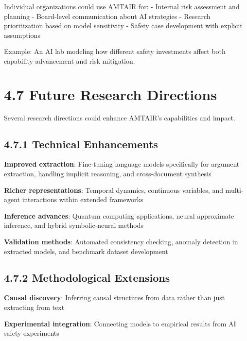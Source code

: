 \documentclass[
  11pt,
  letterpaper,
]{book}
\begin{document}
Individual organizations could use AMTAIR for: - Internal risk
assessment and planning - Board-level communication about AI strategies
- Research prioritization based on model sensitivity - Safety case
development with explicit assumptions

Example: An AI lab modeling how different safety investments affect both
capability advancement and risk mitigation.

\section*{4.7 Future Research Directions}\label{sec-future-research}


Several research directions could enhance AMTAIR's capabilities and
impact.

\subsection*{4.7.1 Technical Enhancements}\label{sec-technical-future}

\textbf{Improved extraction}: Fine-tuning language models specifically
for argument extraction, handling implicit reasoning, and cross-document
synthesis

\textbf{Richer representations}: Temporal dynamics, continuous
variables, and multi-agent interactions within extended frameworks

\textbf{Inference advances}: Quantum computing applications, neural
approximate inference, and hybrid symbolic-neural methods

\textbf{Validation methods}: Automated consistency checking, anomaly
detection in extracted models, and benchmark dataset development

\subsection*{4.7.2 Methodological
Extensions}\label{sec-methodological-future}

\textbf{Causal discovery}: Inferring causal structures from data rather
than just extracting from text

\textbf{Experimental integration}: Connecting models to empirical
results from AI safety experiments
\end{document}
